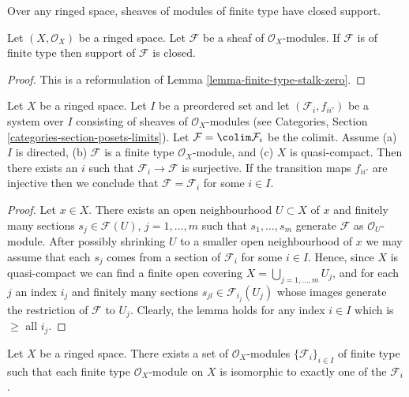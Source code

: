 \begin{lemma}
\label{lemma-support-finite-type-closed}
\begin{slogan}
Over any ringed space, sheaves of modules of finite type have closed support.
\end{slogan}
Let $(X, \mathcal{O}_X)$ be a ringed space.
Let $\mathcal{F}$ be a sheaf of $\mathcal{O}_X$-modules.
If $\mathcal{F}$ is of finite type then support of $\mathcal{F}$ is closed.
\end{lemma}

\begin{proof}
This is a reformulation of Lemma \ref{lemma-finite-type-stalk-zero}.
\end{proof}

\begin{lemma}
\label{lemma-finite-type-quasi-compact-colimit}
Let $X$ be a ringed space. Let $I$ be a preordered set and
let $(\mathcal{F}_i, f_{ii'})$ be a system over $I$ consisting of sheaves
of $\mathcal{O}_X$-modules (see
Categories, Section \ref{categories-section-posets-limits}).
Let $\mathcal{F} = \colim \mathcal{F}_i$ be the colimit. Assume
(a) $I$ is directed,
(b) $\mathcal{F}$ is a finite type $\mathcal{O}_X$-module, and
(c) $X$ is quasi-compact. Then there exists an $i$ such that
$\mathcal{F}_i \to \mathcal{F}$ is surjective.
If the transition maps $f_{ii'}$ are injective
then we conclude that $\mathcal{F} = \mathcal{F}_i$ for some $i \in I$.
\end{lemma}

\begin{proof}
Let $x \in X$. There exists an open neighbourhood
$U \subset X$ of $x$ and finitely many sections
$s_j \in \mathcal{F}(U)$, $j = 1, \ldots, m$ such that
$s_1, \ldots, s_m$ generate $\mathcal{F}$ as $\mathcal{O}_U$-module.
After possibly shrinking $U$ to a smaller open neighbourhood of $x$
we may assume that each $s_j$ comes from a section of $\mathcal{F}_i$
for some $i \in I$.
Hence, since $X$ is quasi-compact we can find a finite open
covering $X = \bigcup_{j = 1, \ldots, m} U_j$, and for each $j$
an index $i_j$ and finitely many sections $s_{jl} \in \mathcal{F}_{i_j}(U_j)$
whose images generate the restriction of $\mathcal{F}$ to
$U_j$. Clearly, the lemma holds for any index $i \in I$ which
is $\geq$ all $i_j$.
\end{proof}

\begin{lemma}
\label{lemma-set-isomorphism-classes-finite-type-modules}
Let $X$ be a ringed space.
There exists a set of $\mathcal{O}_X$-modules
$\{\mathcal{F}_i\}_{i \in I}$ of finite type
such that each finite type $\mathcal{O}_X$-module
on $X$ is isomorphic to exactly one of the $\mathcal{F}_i$.
\end{lemma}


